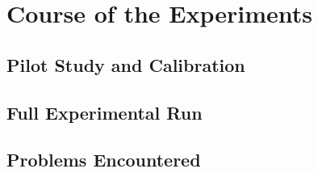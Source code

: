 \chapter{Course of the Experiments}
\label{chap:experiments}

\section{Pilot Study and Calibration}
\label{sec:pilot-study}

\section{Full Experimental Run}
\label{sec:full-run}

\section{Problems Encountered}
\label{sec:problems-encountered}

